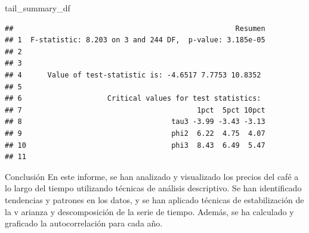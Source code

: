 \documentclass[
  10pt,
  ignorenonframetext,
  aspectratio=1612]{beamer}
\newenvironment{Shaded}{\begin{snugshade}}{\end{snugshade}}
\newcommand{\NormalTok}[1]{#1}
\begin{document}
\begin{frame}[fragile]{}
\label{section-6}
\begin{Shaded}
\begin{Highlighting}[]
\NormalTok{tail\_summary\_df}
\end{Highlighting}
\end{Shaded}

\begin{verbatim}
##                                                    Resumen
## 1  F-statistic: 8.203 on 3 and 244 DF,  p-value: 3.185e-05
## 2                                                         
## 3                                                         
## 4      Value of test-statistic is: -4.6517 7.7753 10.8352 
## 5                                                         
## 6                    Critical values for test statistics: 
## 7                                         1pct  5pct 10pct
## 8                                   tau3 -3.99 -3.43 -3.13
## 9                                   phi2  6.22  4.75  4.07
## 10                                  phi3  8.43  6.49  5.47
## 11
\end{verbatim}
\end{frame}

\begin{frame}{Conclusión}
\label{conclusiuxf3n}
En este informe, se han analizado y visualizado los precios del café a
lo largo del tiempo utilizando técnicas de análisis descriptivo. Se han
identificado tendencias y patrones en los datos, y se han aplicado
técnicas de estabilización de la v arianza y descomposición de la serie
de tiempo. Además, se ha calculado y graficado la autocorrelación para
cada año.
\end{frame}
\end{document}
